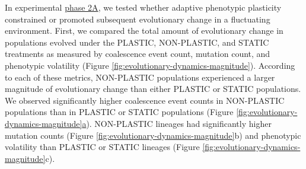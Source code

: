 % 
% 
% 
% 

In experimental \hyperref[sec:methods:exp:evolutionary-change-rate]{phase 2A},
we tested whether adaptive phenotypic plasticity constrained or promoted subsequent evolutionary change in a fluctuating environment. 
First, we compared the total amount of evolutionary change in populations evolved under the PLASTIC, NON-PLASTIC, and STATIC treatments as measured by coalescence event count, mutation count, and phenotypic volatility (Figure \ref{fig:evolutionary-dynamics-magnitude}).
According to each of these metrics, NON-PLASTIC populations experienced a larger magnitude of evolutionary change than either PLASTIC or STATIC populations.
We observed significantly higher coalescence event counts in NON-PLASTIC populations than in PLASTIC or STATIC populations (Figure \ref{fig:evolutionary-dynamics-magnitude}\hyperref[fig:evolutionary-dynamics-magnitude]{a}).
NON-PLASTIC lineages had significantly higher mutation counts (Figure \ref{fig:evolutionary-dynamics-magnitude}b) and phenotypic volatility than PLASTIC or STATIC lineages (Figure \ref{fig:evolutionary-dynamics-magnitude}c).

